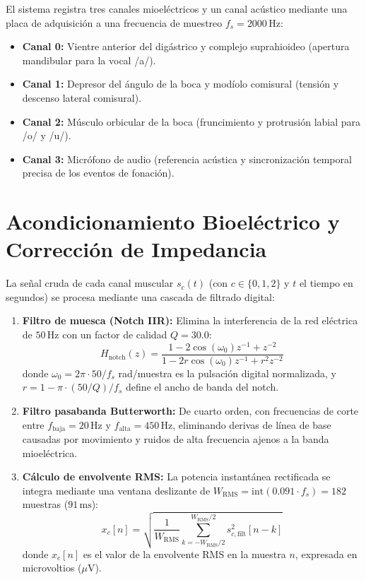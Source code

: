 \documentclass[11pt,a4paper]{article}
\begin{document}
El sistema registra tres canales mioeléctricos y un canal acústico mediante una placa de adquisición a una frecuencia de muestreo $f_s = 2000\,\text{Hz}$:
\begin{itemize}
    \item \textbf{Canal 0:} Vientre anterior del digástrico y complejo suprahioideo (apertura mandibular para la vocal /a/).
    \item \textbf{Canal 1:} Depresor del ángulo de la boca y modíolo comisural (tensión y descenso lateral comisural).
    \item \textbf{Canal 2:} Músculo orbicular de la boca (fruncimiento y protrusión labial para /o/ y /u/).
    \item \textbf{Canal 3:} Micrófono de audio (referencia acústica y sincronización temporal precisa de los eventos de fonación).
\end{itemize}

\section{Acondicionamiento Bioeléctrico y Corrección de Impedancia}
\label{sec:acondicionamiento}

La señal cruda de cada canal muscular $s_c(t)$ (con $c \in \{0, 1, 2\}$ y $t$ el tiempo en segundos) se procesa mediante una cascada de filtrado digital:
\begin{enumerate}
    \item \textbf{Filtro de muesca (Notch IIR):} Elimina la interferencia de la red eléctrica de $50\,\text{Hz}$ con un factor de calidad $Q = 30.0$:
    \begin{equation}
        H_{\text{notch}}(z) = \frac{1 - 2\cos(\omega_0) z^{-1} + z^{-2}}{1 - 2 r \cos(\omega_0) z^{-1} + r^2 z^{-2}}
    \end{equation}
    donde $\omega_0 = 2\pi \cdot 50 / f_s$ rad/muestra es la pulsación digital normalizada, y $r = 1 - \pi \cdot (50/Q) / f_s$ define el ancho de banda del notch.
    \item \textbf{Filtro pasabanda Butterworth:} De cuarto orden, con frecuencias de corte entre $f_{\text{baja}} = 20\,\text{Hz}$ y $f_{\text{alta}} = 450\,\text{Hz}$, eliminando derivas de línea de base causadas por movimiento y ruidos de alta frecuencia ajenos a la banda mioeléctrica.
    \item \textbf{Cálculo de envolvente RMS:} La potencia instantánea rectificada se integra mediante una ventana deslizante de $W_{\text{RMS}} = \text{int}(0.091 \cdot f_s) = 182$ muestras ($91\,\text{ms}$):
    \begin{equation}
        x_c[n] = \sqrt{\frac{1}{W_{\text{RMS}}} \sum_{k = -W_{\text{RMS}}/2}^{W_{\text{RMS}}/2} s_{c,\text{filt}}^2[n - k]}
    \end{equation}
    donde $x_c[n]$ es el valor de la envolvente RMS en la muestra $n$, expresada en microvoltios ($\mu\text{V}$).
\end{enumerate}
\end{document}
